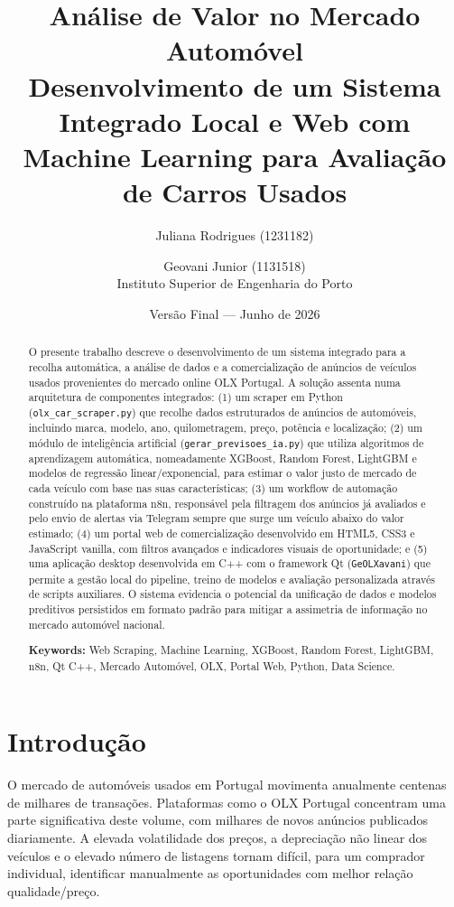 \documentclass[11pt,a4paper]{article}
\title{Análise de Valor no Mercado Automóvel\\
\large Desenvolvimento de um Sistema Integrado Local e Web com Machine Learning para Avaliação de Carros Usados}
\author{Juliana Rodrigues (1231182) \and Geovani Junior (1131518)\\
\small Instituto Superior de Engenharia do Porto}
\date{Versão Final --- Junho de 2026}
\begin{document}
\maketitle

\begin{abstract}
O presente trabalho descreve o desenvolvimento de um sistema integrado para a recolha automática, a análise de dados e a comercialização de anúncios de veículos usados provenientes do mercado online OLX Portugal. A solução assenta numa arquitetura de componentes integrados: (1) um scraper em Python (\texttt{olx\_car\_scraper.py}) que recolhe dados estruturados de anúncios de automóveis, incluindo marca, modelo, ano, quilometragem, preço, potência e localização; (2) um módulo de inteligência artificial (\texttt{gerar\_previsoes\_ia.py}) que utiliza algoritmos de aprendizagem automática, nomeadamente XGBoost, Random Forest, LightGBM e modelos de regressão linear/exponencial, para estimar o valor justo de mercado de cada veículo com base nas suas características; (3) um workflow de automação construído na plataforma n8n, responsável pela filtragem dos anúncios já avaliados e pelo envio de alertas via Telegram sempre que surge um veículo abaixo do valor estimado; (4) um portal web de comercialização desenvolvido em HTML5, CSS3 e JavaScript vanilla, com filtros avançados e indicadores visuais de oportunidade; e (5) uma aplicação desktop desenvolvida em C++ com o framework Qt (\texttt{GeOLXavani}) que permite a gestão local do pipeline, treino de modelos e avaliação personalizada através de scripts auxiliares. O sistema evidencia o potencial da unificação de dados e modelos preditivos persistidos em formato padrão para mitigar a assimetria de informação no mercado automóvel nacional.

\textbf{Keywords:} Web Scraping, Machine Learning, XGBoost, Random Forest, LightGBM, n8n, Qt C++, Mercado Automóvel, OLX, Portal Web, Python, Data Science.
\end{abstract}

\section{Introdução}
O mercado de automóveis usados em Portugal movimenta anualmente centenas de milhares de transações. Plataformas como o OLX Portugal concentram uma parte significativa deste volume, com milhares de novos anúncios publicados diariamente.
A elevada volatilidade dos preços, a depreciação não linear dos veículos e o elevado número de listagens tornam difícil, para um comprador individual, identificar manualmente as oportunidades com melhor relação qualidade/preço.
\end{document}
